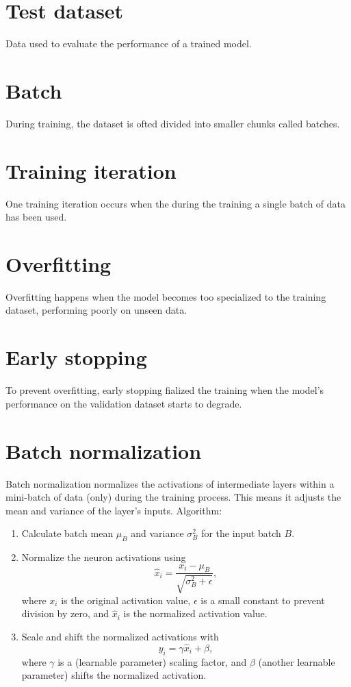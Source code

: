\section{Test dataset}
Data used to evaluate the performance of a trained model.

\section{Batch}
During training, the dataset is ofted divided into smaller chunks
called batches.

\section{Training iteration}
One training iteration occurs when the during the training a single
batch of data has been used.

\section{Overfitting}
Overfitting happens when the model becomes too specialized to the
training dataset, performing poorly on unseen data.

\section{Early stopping}
To prevent overfitting, early stopping fialized the training when the
model's performance on the validation dataset starts to degrade.

\section{Batch normalization}
Batch normalization normalizes the activations of intermediate layers
within a mini-batch of data (only) during the training process. This
means it adjusts the mean and variance of the layer's
inputs. Algorithm:
\begin{enumerate}
\item Calculate batch mean $\mu_B$ and variance $\sigma^2_B$ for the input batch $B$.
\item Normalize the neuron activations using
  \begin{equation}
    \hat{x}_i = \frac{x_i-\mu_B}{\sqrt{\sigma^2_B+\epsilon}},
  \end{equation}
  where $x_i$ is the original  activation value, $\epsilon$ is a small
  constant  to  prevent  division  by zero,  and  $\hat{x}_i$  is  the
  normalized activation value.
\item Scale and shift the normalized activations with
  \begin{equation}
    y_i = \gamma\hat{x}_i+\beta,
  \end{equation}
  where $\gamma$ is a (learnable parameter) scaling factor, and
  $\beta$ (another learnable parameter) shifts the normalized
  activation.
\end{enumerate}

